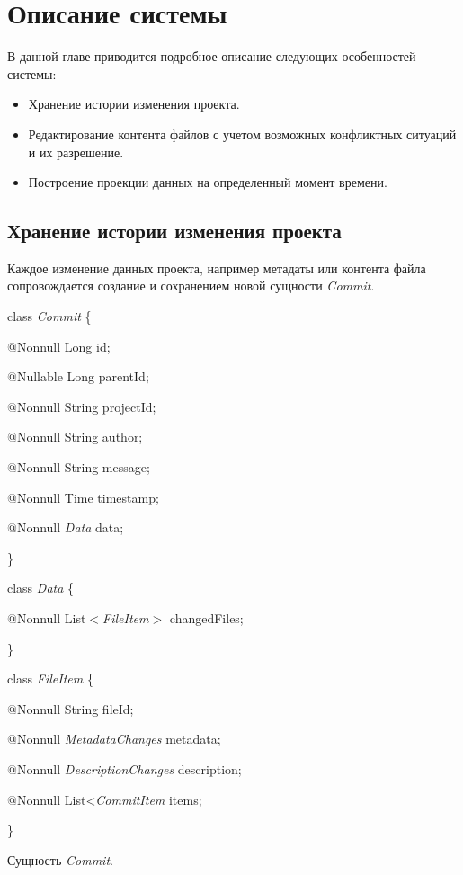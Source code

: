 \documentclass[a4paper,14pt]{extreport} %
\begin{document}
\newpage
\section{Описание системы}

В данной главе приводится подробное описание следующих особенностей системы:
\begin{itemize}
\item Хранение истории изменения проекта.
\item Редактирование контента файлов с учетом возможных конфликтных ситуаций и их разрешение.
\item Построение проекции данных на определенный момент времени.
\end{itemize} 

\subsection{Хранение истории изменения проекта}

Каждое изменение данных проекта, например метадаты или контента файла сопровождается создание и сохранением новой сущности \textit{Commit}.
\begin{algorithm}[H]
class \textit{Commit} \{

	\hspace{0.5cm}$@$Nonnull 		Long 			id;
	
	\hspace{0.5cm}$@$Nullable		Long				parentId;
	
	\hspace{0.5cm}$@$Nonnull		String			projectId;
	
	\hspace{0.5cm}$@$Nonnull		String			author;
	
	\hspace{0.5cm}$@$Nonnull		String			message;
	
	\hspace{0.5cm}$@$Nonnull		Time				timestamp;
	
	\hspace{0.5cm}$@$Nonnull		\textit{Data}	data;
	
\}

class \textit{Data} \{

	\hspace{0.5cm}$@$Nonnull	List$<$\textit{FileItem}$>$ changedFiles;
	
\}

class \textit{FileItem} \{

	\hspace{0.5cm}$@$Nonnull	String fileId;
	
	\hspace{0.5cm}$@$Nonnull	\textit{MetadataChanges} metadata;
	
	\hspace{0.5cm}$@$Nonnull	\textit{DescriptionChanges} description;
	
	\hspace{0.5cm}$@$Nonnull	List<\textit{CommitItem} items;
	
\}
\caption{Сущность \textit{Commit}.}
\label{entity_commit}
\end{algorithm}
\end{document}

